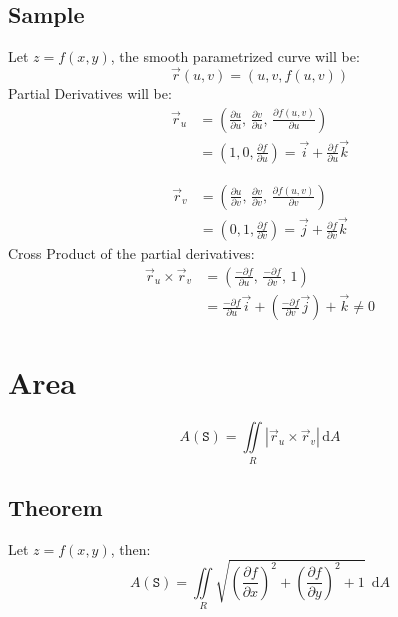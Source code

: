 \documentclass[12pt, fleqn]{book}
\newcommand{\D}{\mathrm{d}}
\newcommand{\rutrv}{\vec{r}_u \times \vec{r}_v\right}
\newcommand{\xy}{(x, y)}
\newcommand{\uv}{(u, v)}
\newcommand{\rond}[2]{\frac{\partial #1}{\partial #2}}
\begin{document}
		\subsection{Sample}
			Let $z = f\xy$, the smooth parametrized curve will be:
				\begin{equation}
					\vec{r}\uv = (u, v, f\uv)
				\end{equation}
		 	Partial Derivatives will be:
			 	\begin{equation}
				 	\begin{split}
				 		\vec{r}_u 
				 		& = (
				 			\rond{u}{u}, \,
				 			\rond{v}{u}, \,
				 			\rond{f\uv}{u}
				 		) \\
				 		& = (1, 0, \rond{f}{u})
			              = \vec{i} + \rond{f}{u} \vec{k}
				 	\end{split}
			 	\end{equation}
		 	
			 	\begin{equation}
				 	\begin{split}
						\vec{r}_v 
						& = (
								\rond{u}{v}, \,
								\rond{v}{v}, \,
								\rond{f\uv}{v}
							) \\
						& = (0, 1, \rond{f}{v})
						  = \vec{j} + \rond{f}{v} \vec{k}
					\end{split}
				\end{equation}
	 	    Cross Product of the partial derivatives:
	 	    \begin{equation}
				\begin{split}
					\vec{r}_u \times \vec{r}_v 
					& = (
						\frac{- \partial f}{\partial u}, \, 
						\frac{- \partial f}{\partial v}, \, 
						1
					) \\
					& = \frac{- \partial f}{\partial u} \vec{i} +
					    (\frac{- \partial f}{\partial v} \vec{j}) + 
					    \vec{k} \neq 0
				\end{split}
			\end{equation}
	\section{Area}
		\begin{equation}
			A(\mathtt{S}) = \iint\limits_R \left|\rutrv| \, \D A
		\end{equation}
		\subsection{Theorem}
			Let $z = f\xy$, then:
			\begin{equation}
				A(\mathtt{S}) = 
				  \iint\limits_R 
				  \sqrt{
				  	(\rond{f}{x})^2 + 
				  	(\rond{f}{y})^2 + 
				  	1
			  	} 
				  \ \ \D A
			\end{equation}
\end{document}
